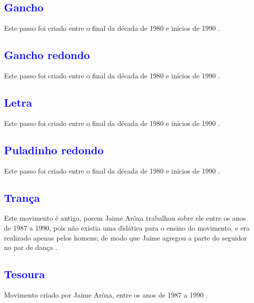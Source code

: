 \subsection{\textcolor{blue}{Gancho}} 
Este passo foi  criado entre o final da década de 1980 e inícios de 1990  \cite[pp. 143]{perna2002samba}.

\subsection{\textcolor{blue}{Gancho redondo}} 
Este passo foi  criado entre o final da década de 1980 e inícios de 1990  \cite[pp. 143]{perna2002samba}.

\subsection{\textcolor{blue}{Letra}}
Este passo foi  criado entre o final da década de 1980 e inícios de 1990  \cite[pp. 143]{perna2002samba}.

\subsection{\textcolor{blue}{Puladinho redondo}} 
Este passo foi  criado entre o final da década de 1980 e inícios de 1990  \cite[pp. 143]{perna2002samba}.

\subsection{\textcolor{blue}{Trança}}
Este movimento é antigo, porem Jaime Arôxa trabalhou sobre ele entre os anos de 1987 a 1990,
pois não existia uma didática para o ensino do movimento, 
e era realizado apenas pelos homens; 
de modo que Jaime agregou a parte do seguidor no par de dança  \cite{EntrevistaJaimeAroxa1} \cite[pp. 143]{perna2002samba}.
\subsection{\textcolor{blue}{Tesoura}}
Movimento criado por Jaime Arôxa, entre os anos de 1987 a 1990 \cite{EntrevistaJaimeAroxa1} \cite[pp. 143]{perna2002samba}.

